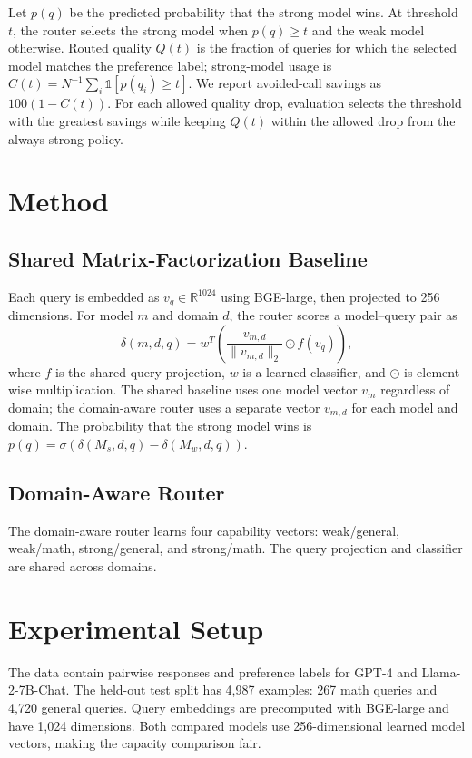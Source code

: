 \documentclass[conference]{IEEEtran}
\begin{document}
Let $p(q)$ be the predicted probability that the strong model wins. At threshold $t$, the router selects the strong model when $p(q)\geq t$ and the weak model otherwise. Routed quality $Q(t)$ is the fraction of queries for which the selected model matches the preference label; strong-model usage is $C(t)=N^{-1}\sum_i\mathbb{1}[p(q_i)\geq t]$. We report avoided-call savings as $100(1-C(t))$. For each allowed quality drop, evaluation selects the threshold with the greatest savings while keeping $Q(t)$ within the allowed drop from the always-strong policy.

\section{Method}
\subsection{Shared Matrix-Factorization Baseline}
Each query is embedded as $v_q \in \mathbb{R}^{1024}$ using BGE-large, then projected to 256 dimensions. For model $m$ and domain $d$, the router scores a model--query pair as
\begin{equation}
\delta(m,d,q)=w^T\left(\frac{v_{m,d}}{\lVert v_{m,d}\rVert_2}\odot f(v_q)\right),
\end{equation}
where $f$ is the shared query projection, $w$ is a learned classifier, and $\odot$ is element-wise multiplication. The shared baseline uses one model vector $v_m$ regardless of domain; the domain-aware router uses a separate vector $v_{m,d}$ for each model and domain. The probability that the strong model wins is $p(q)=\sigma(\delta(M_s,d,q)-\delta(M_w,d,q))$.

\subsection{Domain-Aware Router}
The domain-aware router learns four capability vectors: weak/general, weak/math, strong/general, and strong/math. The query projection and classifier are shared across domains.

\section{Experimental Setup}
The data contain pairwise responses and preference labels for GPT-4 and Llama-2-7B-Chat. The held-out test split has 4,987 examples: 267 math queries and 4,720 general queries. Query embeddings are precomputed with BGE-large and have 1,024 dimensions. Both compared models use 256-dimensional learned model vectors, making the capacity comparison fair.
\end{document}
